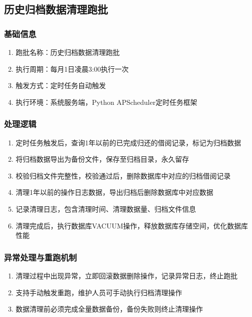\documentclass[12pt, a4paper]{article}
\begin{document}
\subsection{历史归档数据清理跑批}

\subsubsection{基础信息}

\begin{enumerate}
\item  跑批名称：历史归档数据清理跑批

\item  执行周期：每月1日凌晨3:00执行一次

\item  触发方式：定时任务自动触发

\item  执行环境：系统服务端，Python APScheduler定时任务框架
\end{enumerate}

\subsubsection{处理逻辑}

\begin{enumerate}
\item  定时任务触发后，查询1年以前的已完成归还的借阅记录，标记为归档数据

\item  将归档数据导出为备份文件，保存至归档目录，永久留存

\item  校验归档文件完整性，校验通过后，删除数据库中对应的归档借阅记录

\item  清理1年以前的操作日志数据，导出归档后删除数据库中对应数据

\item  记录清理日志，包含清理时间、清理数据量、归档文件信息

\item  清理完成后，执行数据库VACUUM操作，释放数据库存储空间，优化数据库性能
\end{enumerate}

\subsubsection{异常处理与重跑机制}

\begin{enumerate}
\item  清理过程中出现异常，立即回滚数据删除操作，记录异常日志，终止跑批

\item  支持手动触发重跑，维护人员可手动执行归档清理操作

\item  数据清理前必须完成全量数据备份，备份失败则终止清理操作
\end{enumerate}
\end{document}
